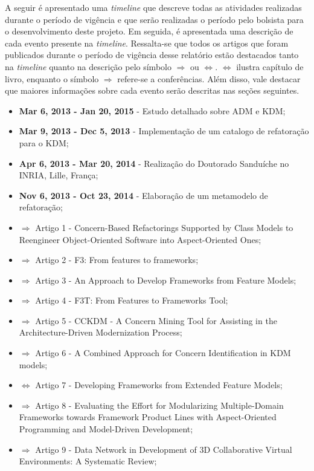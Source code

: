 A seguir é apresentado uma \textit{timeline} que descreve todas as atividades realizadas durante o período de vigência e que serão realizadas o período pelo bolsista para o desenvolvimento deste projeto. Em seguida, é apresentada uma descrição de cada evento presente na \textit{timeline}. Ressalta-se que todos os artigos que foram publicados durante o período de vigência desse relatório estão destacados tanto na \textit{timeline} quanto na descrição pelo símbolo $\Rightarrow$ ou $\Leftrightarrow$. $\Leftrightarrow$ ilustra capítulo de livro, enquanto o símbolo $\Rightarrow$ refere-se a conferências. Além disso, vale destacar que maiores informações sobre cada evento serão descritas nas seções seguintes.

\begin{itemize}

\item \textbf{Mar 6, 2013 - Jan 20, 2015} - Estudo detalhado sobre ADM e KDM;
\item \textbf{Mar 9, 2013 - Dec 5, 2013} - Implementação de um catalogo de refatoração para o KDM;
\item \textbf{Apr 6, 2013 - Mar 20, 2014} - Realização do Doutorado Sanduíche no INRIA, Lille, França;
\item \textbf{Nov 6, 2013 - Oct 23, 2014} - Elaboração de um metamodelo de refatoração;
\item $\Rightarrow$ Artigo 1 - Concern-Based Refactorings Supported by Class Models to Reengineer Object-Oriented Software into Aspect-Oriented Ones;
\item $\Rightarrow$ Artigo 2 - F3: From features to frameworks;
\item $\Rightarrow$ Artigo 3 - An Approach to Develop Frameworks from Feature Models;
\item $\Rightarrow$ Artigo 4 - F3T: From Features to Frameworks Tool;
\item $\Rightarrow$ Artigo 5 - CCKDM - A Concern Mining Tool for Assisting in the Architecture-Driven Modernization Process;
\item $\Rightarrow$ Artigo 6 - A Combined Approach for Concern Identification in KDM models;
\item $\Leftrightarrow$ Artigo 7 - Developing Frameworks from Extended Feature Models;
\item $\Rightarrow$ Artigo 8 - Evaluating the Effort for Modularizing Multiple-Domain Frameworks towards Framework Product Lines with Aspect-Oriented Programming and Model-Driven Development;
\item $\Rightarrow$ Artigo 9 - Data Network in Development of 3D Collaborative Virtual Environments: A Systematic Review;

\end{itemize}
